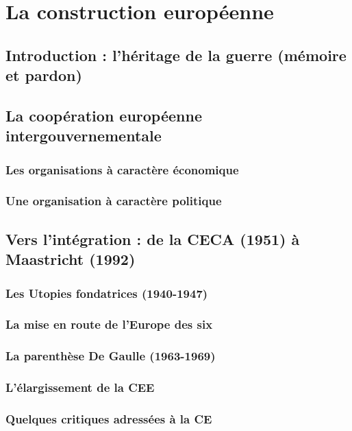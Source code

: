 \documentclass[12pt]{report}
\begin{document}
\chapter{La construction européenne}

\section*{Introduction : l'héritage de la guerre (mémoire et pardon)}

\section{La coopération européenne intergouvernementale}

\subsection{Les organisations à caractère économique}

\subsection{Une organisation à caractère politique}

\section{Vers l'intégration : de la CECA (1951) à Maastricht (1992)}

\subsection{Les Utopies fondatrices (1940-1947)}

\subsection{La mise en route de l'Europe des six}

\subsection{La parenthèse De Gaulle (1963-1969)}

\subsection{L'élargissement de la CEE}

\subsection{Quelques critiques adressées à la CE}
\end{document}

